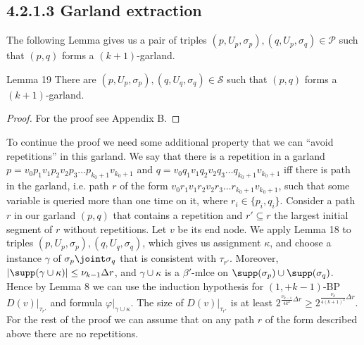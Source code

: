 \subsection*{4.2.1.3 Garland extraction}
The following Lemma gives us a pair of triples $(p,U_p,\sigma_p),(q,U_p,\sigma_q)\in\mathcal P$ such that $(p,q)$ forms a $(k+1)$-garland.
\begin{result}{Lemma 19}
There are $(p,U_p,\sigma_p),(q,U_q,\sigma_q)\in\mathcal S$ such that $(p,q)$ forms a $(k+1)$-garland.
\end{result}
\begin{proof}For the proof see Appendix B.\end{proof}
To continue the proof we need some additional property that we can ``avoid repetitions'' in this garland. We say that there is a repetition in a garland $p=v_0p_1v_1p_2v_2p_3\ldots p_{k_0+1}v_{k_0+1}$ and $q=v_0q_1v_1q_2v_2q_3\ldots q_{k_0+1}v_{k_0+1}$ iff there is path in the garland, i.e. path $r$ of the form $v_0r_1v_1r_2v_2r_3\ldots r_{k_0+1}v_{k_0+1}$, such that some variable is queried more than one time on it, where $r_i\in\{p_i,q_i\}$.
Consider a path $r$ in our garland $(p,q)$ that contains a repetition and $r'\subseteq r$ the largest initial segment of $r$ without repetitions. Let $v$ be its end node. We apply Lemma 18 to triples $(p,U_p,\sigma_p),(q,U_q,\sigma_q)$, which gives us assignment $\kappa$, and choose a instance $\gamma$ of $\sigma_p\joint\sigma_q$ that is consistent with $\tau_{r'}$. Moreover, $|\supp(\gamma\cup\kappa)|\le\nu_{k-1}\Delta r$, and $\gamma\cup\kappa$ is a $\beta'$-mlce on $\supp(\sigma_p)\cup\supp(\sigma_q)$. Hence by Lemma 8 we can use the induction hypothesis for $(1,+k-1)$-BP $D(v)|_{\tau_{r'}}$ and formula $\varphi|_{\gamma\cup\kappa}$. The size of $D(v)|_{\tau_{r'}}$ is at least $2^{\frac{\nu_{k-1}}{4k^2}\Delta r}\ge2^{\frac{\nu_k}{4(k+1)^2}\Delta r}$.
For the rest of the proof we can assume that on any path $r$ of the form described above there are no repetitions.
